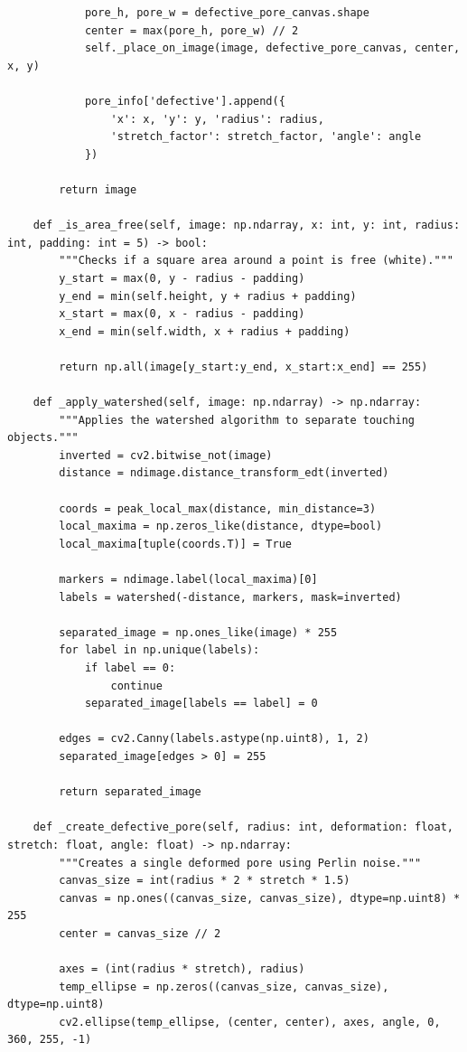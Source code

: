 \documentclass[code]{wordcore}
\begin{document}
\begin{code}
\begin{verbatim}
            pore_h, pore_w = defective_pore_canvas.shape
            center = max(pore_h, pore_w) // 2
            self._place_on_image(image, defective_pore_canvas, center, x, y)

            pore_info['defective'].append({
                'x': x, 'y': y, 'radius': radius,
                'stretch_factor': stretch_factor, 'angle': angle
            })

        return image

    def _is_area_free(self, image: np.ndarray, x: int, y: int, radius: int, padding: int = 5) -> bool:
        """Checks if a square area around a point is free (white)."""
        y_start = max(0, y - radius - padding)
        y_end = min(self.height, y + radius + padding)
        x_start = max(0, x - radius - padding)
        x_end = min(self.width, x + radius + padding)

        return np.all(image[y_start:y_end, x_start:x_end] == 255)

    def _apply_watershed(self, image: np.ndarray) -> np.ndarray:
        """Applies the watershed algorithm to separate touching objects."""
        inverted = cv2.bitwise_not(image)
        distance = ndimage.distance_transform_edt(inverted)
        
        coords = peak_local_max(distance, min_distance=3)
        local_maxima = np.zeros_like(distance, dtype=bool)
        local_maxima[tuple(coords.T)] = True
        
        markers = ndimage.label(local_maxima)[0]
        labels = watershed(-distance, markers, mask=inverted)
        
        separated_image = np.ones_like(image) * 255
        for label in np.unique(labels):
            if label == 0:
                continue
            separated_image[labels == label] = 0
            
        edges = cv2.Canny(labels.astype(np.uint8), 1, 2)
        separated_image[edges > 0] = 255
        
        return separated_image

    def _create_defective_pore(self, radius: int, deformation: float, stretch: float, angle: float) -> np.ndarray:
        """Creates a single deformed pore using Perlin noise."""
        canvas_size = int(radius * 2 * stretch * 1.5)
        canvas = np.ones((canvas_size, canvas_size), dtype=np.uint8) * 255
        center = canvas_size // 2

        axes = (int(radius * stretch), radius)
        temp_ellipse = np.zeros((canvas_size, canvas_size), dtype=np.uint8)
        cv2.ellipse(temp_ellipse, (center, center), axes, angle, 0, 360, 255, -1)


\end{verbatim}
\end{code}
\end{document}
